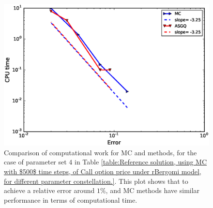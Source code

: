 	\begin{figure}[h!]
	\centering
	\includegraphics[width=0.5\linewidth]{./figures/rBergomi_Complexity_rates/set7/error_vs_time_set7_full_comparison}
	
	\caption{Comparison of computational work for MC and  methods, for the case of parameter set $4$ in Table \ref{table:Reference solution, using MC with $500$ time steps, of Call option price under rBergomi model, for different parameter constellation.}. This plot shows that to achieve a relative error around $1\%$,  and  MC methods have similar performance in terms of computational time.}
	\label{fig:Complexity plot for MC and MISC for Case set $5$ parameters}
\end{figure}
\FloatBarrier


